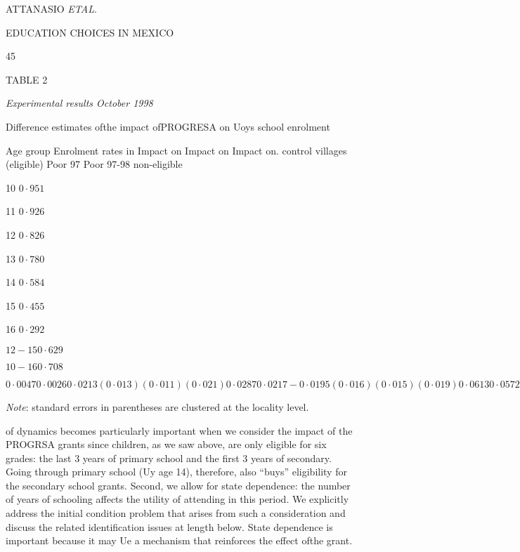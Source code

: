 ATTANASIO {\it ETAL}.

EDUCATION CHOICES IN MEXICO

45

TABLE 2

{\it Experimental results October 1998}

Difference estimates ofthe impact ofPROGRESA on Uoys school enrolment

Age group Enrolment rates in Impact on Impact on Impact on. control villages (eligible) Poor 97 Poor 97-98 non-eligible

10 $0\cdot 951$

11 $0\cdot 926$

12 $0\cdot 826$

13 $0\cdot 780$

14 $0\cdot 584$

15 $0\cdot 455$

16 $0\cdot 292$

$12-15 0\cdot 629$

$10-16 0\cdot 708$

$0\cdot 0047 0\cdot 0026 0\cdot 0213 (0\cdot 013) (0\cdot 011) (0\cdot 021) 0\cdot 0287 0\cdot 0217 -0\cdot 0195 (0\cdot 016) (0\cdot 015) (0\cdot 019) 0\cdot 0613 0\cdot 0572 0\cdot 0353 (0\cdot 024) (0\cdot 022) (0\cdot 043) 0\cdot 0476 0\cdot 0447 0\cdot 0588 (0\cdot 030) (0\cdot 027) (0\cdot 060) 0\cdot 1416 0\cdot 1330 0\cdot 0672 (0\cdot 039) (0\cdot 035) (0\cdot 061) 0\cdot 0620 0\cdot 0484 0\cdot 1347 (0\cdot 042) (0\cdot 039) (0\cdot 063) 0\cdot 0304 0\cdot 0355 0\cdot 1063 (0\cdot 038) (0\cdot 036) (0\cdot 067) 0\cdot 0655 0\cdot 0720 0\cdot 0668 (0\cdot 027) (0\cdot 024) (0\cdot 022) 0\cdot 0502 0\cdot 0456 0\cdot 0810 (0\cdot 018) (0\cdot 015) (0\cdot 026)$

{\it Note}: standard errors in parentheses are clustered at the locality level.

of dynamics becomes particularly important when we consider the impact of the PROGRSA grants since children, as we saw above, are only eligible for six grades: the last 3 years of primary school and the first 3 years of secondary. Going through primary school (Uy age 14), therefore, also ``buys'' eligibility for the secondary school grants. Second, we allow for state dependence: the number of years of schooling affects the utility of attending in this period. We explicitly address the initial condition problem that arises from such a consideration and discuss the related identification issues at length below. State dependence is important because it may Ue a mechanism that reinforces the effect ofthe grant.

